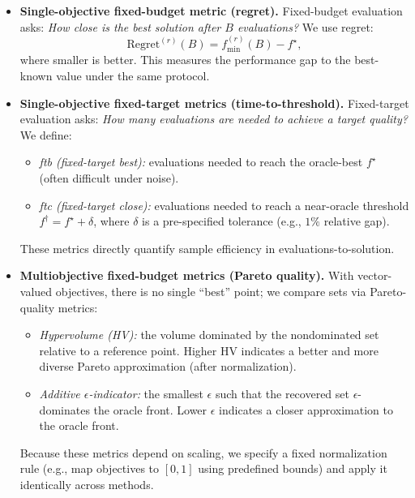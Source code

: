 \begin{itemize}
    \item \textbf{Single-objective fixed-budget metric (regret).}
    Fixed-budget evaluation asks: \emph{How close is the best solution after \(B\) evaluations?}
    We use regret:
    \[
        \mathrm{Regret}^{(r)}(B) = f_{\min}^{(r)}(B) - f^\star,
    \]
    where smaller is better. This measures the performance gap to the best-known value under the same protocol.

    \item \textbf{Single-objective fixed-target metrics (time-to-threshold).}
    Fixed-target evaluation asks: \emph{How many evaluations are needed to achieve a target quality?}
    We define:
    \begin{itemize}
        \item \emph{ftb (fixed-target best):} evaluations needed to reach the oracle-best \(f^\star\) (often difficult under noise).
        \item \emph{ftc (fixed-target close):} evaluations needed to reach a near-oracle threshold \(f^\dagger = f^\star + \delta\),
        where \(\delta\) is a pre-specified tolerance (e.g., \(1\%\) relative gap).
    \end{itemize}
    These metrics directly quantify sample efficiency in evaluations-to-solution.

    \item \textbf{Multiobjective fixed-budget metrics (Pareto quality).}
    With vector-valued objectives, there is no single ``best'' point; we compare sets via Pareto-quality metrics:
    \begin{itemize}
        \item \emph{Hypervolume (HV):} the volume dominated by the nondominated set relative to a reference point.
        Higher HV indicates a better and more diverse Pareto approximation (after normalization).
        \item \emph{Additive \(\epsilon\)-indicator:} the smallest \(\epsilon\) such that the recovered set \(\epsilon\)-dominates the oracle front.
        Lower \(\epsilon\) indicates a closer approximation to the oracle front.
    \end{itemize}
    Because these metrics depend on scaling, we specify a fixed normalization rule (e.g., map objectives to \([0,1]\) using predefined bounds)
    and apply it identically across methods.


\end{itemize}
